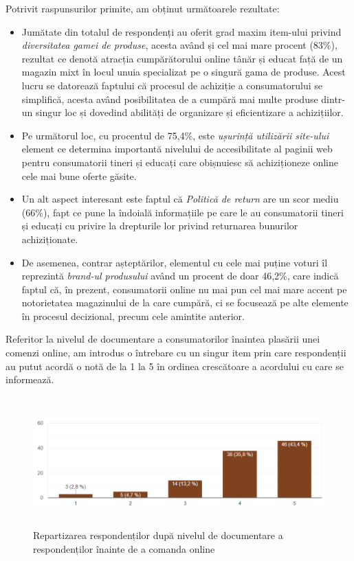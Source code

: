 \documentclass[a4paper, 12pt]{article}
\begin{document}
\begin{enumerate}[(A)]
\begin{center}
		\end{center}
		\qquad Potrivit raspunsurilor primite, am obținut următoarele rezultate:
		\begin{itemize}
			\item Jumătate din totalul de respondenți au oferit grad maxim item-ului privind \textit{diversitatea gamei de produse}, acesta având și cel mai mare procent (83\%), rezultat ce denotă atracția cumpărătorului online tânăr și educat față de un magazin mixt  în locul unuia specializat pe o singură gama de produse. Acest lucru se datorează faptului că procesul de achiziție a consumatorului se simplifică, acesta având posibilitatea de a cumpără mai multe produse dintr-un singur loc și dovedind abilități de organizare și eficientizare a achizițiilor.
			\item Pe următorul loc, cu procentul de 75,4\%, este \textit{ușurință utilizării site-ului} element ce determina importantă nivelului de accesibilitate al paginii web pentru consumatorii tineri și educați care obișnuiesc să achiziționeze online cele mai bune oferte găsite.
			\item Un alt aspect interesant este faptul că \textit{Politică de return }are un scor mediu (66\%), fapt ce pune la îndoială informațiile pe care le au consumatorii tineri și educați cu privire la drepturile lor privind returnarea bunurilor achiziționate. 
			\item De asemenea, contrar așteptărilor, elementul cu cele mai puține voturi îl reprezintă \textit{brand-ul produsului} având un procent de doar 46,2\%, care indică faptul că, în prezent, consumatorii online nu mai pun cel mai mare accent pe notorietatea  magazinului de la care cumpără, ci se focusează pe alte elemente în procesul decizional, precum cele amintite anterior.
		\end{itemize}
		
		\quad  Referitor la nivelul de documentare a consumatorilor înaintea plasării unei comenzi online, am introdus o întrebare cu un singur item prin care respondenții au putut acordă o notă de la 1 la 5 în ordinea crescătoare a acordului cu care se informează.
		
		\begin{figure}[!htb]
			\centering
			\includegraphics[width=14cm, height=5cm]{"figures/trei.png"}
			\caption{ Repartizarea respondenților după nivelul de documentare a respondenților înainte de a comanda online}\label{fig:unuspre}
		\end{figure}
	

\end{enumerate}
\end{document}

